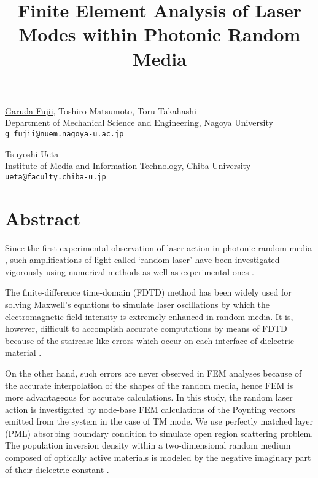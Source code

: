 \title{Finite Element Analysis of Laser Modes within Photonic Random Media}
\author{} \institute{}
\maketitle

\begin{center}
{\large \underline{Garuda Fujii},  Toshiro Matsumoto, Toru Takahashi}\\
Department of Mechanical Science and Engineering, Nagoya University\\
{\tt g\_fujii@nuem.nagoya-u.ac.jp}\\
\vspace{4mm}

{\large Tsuyoshi Ueta}\\
Institute of Media and Information Technology, Chiba University\\
{\tt ueta@faculty.chiba-u.jp}
\end{center}

\section*{Abstract}
Since the first experimental observation of laser action in photonic random media \cite{Lawandy}, such amplifications of light called `random laser' \cite{Wiersma} have been investigated vigorously using numerical methods \cite{Vanneste,Sebbah} as well as experimental ones \cite{Cao}.

The finite-difference time-domain (FDTD) method has been widely used for solving Maxwell's equations to simulate laser oscillations by which the electromagnetic field intensity is extremely enhanced in random media. It is, however, difficult to accomplish accurate computations by means of FDTD because of the staircase-like errors which occur on each interface of dielectric material \cite{Akyurtlu}.

On the other hand, such errors are never observed in FEM analyses because of the accurate interpolation of the shapes of the random media, hence FEM is more  advantageous for accurate calculations. In this study, the random laser action is investigated by node-base FEM calculations of the Poynting vectors emitted from the system in the case of TM mode. We use perfectly matched layer (PML) absorbing boundary condition to simulate open region scattering problem. The population inversion density within a two-dimensional random medium composed of optically active materials is modeled by the negative imaginary part of their dielectric constant \cite{Sakoda}.

